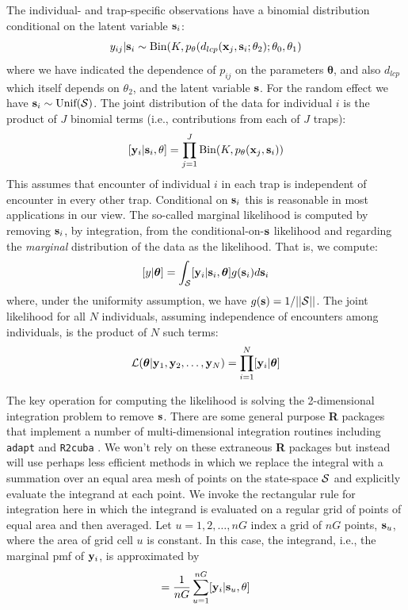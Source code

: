 \documentclass[12pt]{article}
\begin{document}
The individual- and trap-specific observations have a binomial
distribution conditional on the latent variable ${\bf s}_{i}$:
\begin{equation}
	y_{ij}| {\bf s}_{i} \sim \mbox{Bin}(K, p_{\theta}(d_{lcp}({\bf x}_{j},{\bf s}_{i};\theta_{2}); \theta_{0}, \theta_{1})
\label{mle.eq.cond-on-s}
\end{equation}
where we have indicated the dependence of $p_{ij}$ on the parameters
${\bm \theta}$, and also $d_{lcp}$ which
itself depends on $\theta_{2}$, and the latent variable ${\bf s}$.
For the random effect we have ${\bf s}_{i} \sim  \mbox{Unif}({\cal
  S})$.
The joint distribution of the data for individual $i$ is the product
of $J$ binomial terms (i.e., contributions from each of $J$ traps):
\[
  [{\bf y}_{i} | {\bf s}_{i} , \theta] =
  \prod_{j=1}^{J} \mbox{Bin}(K, p_{\theta}({\bf x}_{j},{\bf s}_{i}) )
\]
This assumes that encounter of individual $i$ in each
trap is independent of encounter in every other trap. Conditional on
${\bf s}_{i}$ this is reasonable in most applications in our view.
 The so-called marginal likelihood is computed by removing
${\bf s}_{i}$, by integration,  from the conditional-on-${\bf s}$
likelihood and regarding the {\it marginal} distribution of the data
as the likelihood. That
is, we compute:
\[
  [y|{\bm \theta}] =
\int_{{\cal S}}  [ {\bf y}_{i} |{\bf s}_{i},{\bm \theta}] g({\bf s}_{i}) d{\bf s}_{i}
\]
where, under the uniformity assumption, we have
$g({\bf s}) = 1/||{\cal S}||$.
The joint likelihood for all $N$ individuals, assuming independence of
encounters among individuals, is the product of $N$ such terms:
\[
{\cal L}({\bm \theta} | {\bf y}_{1},{\bf y}_{2},\ldots, {\bf y}_{N}) = \prod_{i=1}^{N}
[{\bf y}_{i}|{\bm \theta}]
\]

The key operation for computing the likelihood is solving the
2-dimensional integration problem to remove ${\bf s}$. There are some
general purpose {\bf R} packages that implement a number of
multi-dimensional integration routines including \mbox{\tt adapt}
\citep{genz_etal:2007} and \mbox{\tt R2cuba} \citep{hahn_etal:2011}.
We won't rely on these extraneous {\bf R} packages but instead will
use perhaps less efficient methods in which we replace the integral
with a summation over an equal area mesh of points on the state-space
${\cal S}$ and explicitly evaluate the integrand at each point. We
invoke the rectangular rule for integration here in which the
integrand is evaluated on a regular grid of points of equal area and
then averaged.  Let $u=1,2,\ldots,nG$ index a grid of $nG$ points,
${\bf s}_{u}$, where the area of grid cell $u$ is constant.  In this
case, the integrand, i.e., the marginal pmf of ${\bf y}_{i}$, is
approximated by
\begin{equation}
         [{\bf y}_{i}|\theta] = \frac{1}{nG} \sum_{u=1}^{nG}  [ {\bf
            y}_{i} |{\bf s}_u, \theta]
\label{mle.eq.intlik}
\end{equation}
\end{document}
